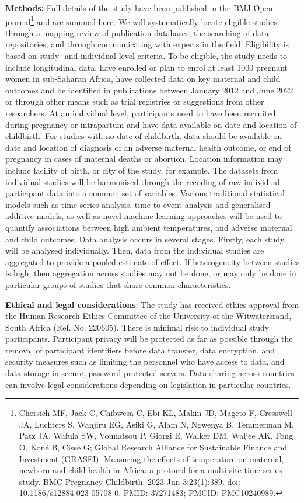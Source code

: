 \documentclass[12pt,letterpaper]{article}
\begin{document}
\textbf{Methods:} Full details of the study have been published in the BMJ Open journal\footnote{Chersich MF, Jack C, Chibwesa C, Ebi KL, Makin JD, Mageto F, Cresswell JA, Luchters S, Wanjiru EG, Asiki G, Alam N, Ngwenya B, Temmerman M, Patz JA, Wafula SW, Vounatsou P, Giorgi E, Walker DM, Waljee AK, Fong O, Koné B, Cissé G; Global Research Alliance for Sustainable Finance and Investment (GRASFI). Measuring the effects of temperature on maternal, newborn and child health in Africa: a protocol for a multi-site time-series study. BMC Pregnancy Childbirth. 2023 Jun 3;23(1):389. doi: 10.1186/s12884-023-05708-0. PMID: 37271483; PMCID: PMC10240989.} and are summed here. We will systematically locate eligible studies through a mapping review of publication databases, the searching of data repositories, and through communicating with experts in the field. Eligibility is based on study- and individual-level criteria. To be eligible, the study needs to include longitudinal data, have enrolled or plan to enrol at least 1000 pregnant women in sub-Saharan Africa, have collected data on key maternal and child outcomes and be identified in publications between January 2012 and June 2022 or through other means such as trial registries or suggestions from other researchers. At an individual level, participants need to have been recruited during pregnancy or intrapartum and have data available on date and location of childbirth. For studies with no date of childbirth, data should be available on date and location of diagnosis of an adverse maternal health outcome, or end of pregnancy in cases of maternal deaths or abortion. Location information may include facility of birth, or city of the study, for example. The datasets from individual studies will be harmonised through the recoding of raw individual participant data into a common set of variables. Various traditional statistical models such as time-series analysis, time-to event analysis and generalised additive models, as well as novel machine learning approaches will be used to quantify associations between high ambient temperatures, and adverse maternal and child outcomes. Data analysis occurs in several stages. Firstly, each study will be analysed individually. Then, data from the individual studies are aggregated to provide a pooled estimate of effect. If heterogeneity between studies is high, then aggregation across studies may not be done, or may only be done in particular groups of studies that share common characteristics.

\textbf{Ethical and legal considerations}: The study has received ethics approval from the Human Research Ethics Committee of the University of the Witwatersrand, South Africa (Ref. No. 220605). There is minimal risk to individual study participants. Participant privacy will be protected as far as possible through the removal of participant identifiers before data transfer, data encryption, and security measures such as limiting the personnel who have access to data, and data storage in secure, password-protected servers. Data sharing across countries can involve legal considerations depending on legislation in particular countries.
\end{document}
